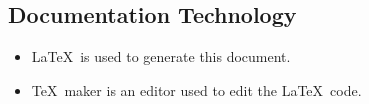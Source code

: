 \subsection{Documentation Technology}
\begin{itemize}
\item \LaTeX\ is used to generate this document.
\item \TeX\ maker is an editor used to edit the \LaTeX\ code.
\end{itemize}






